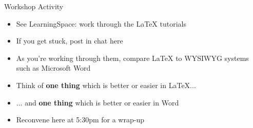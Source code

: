 \begin{frame}{Workshop Activity}
	\begin{itemize}
		\pause\item See LearningSpace: work through the LaTeX tutorials
		\pause\item If you get stuck, post in chat here
		\pause\item As you're working through them, compare LaTeX to WYSIWYG systems such as Microsoft Word
		\pause\item Think of \textbf{one thing} which is better or easier in LaTeX...
		\pause\item ... and \textbf{one thing} which is better or easier in Word
		\pause\item Reconvene here at 5:30pm for a wrap-up
    \end{itemize}
\end{frame}

